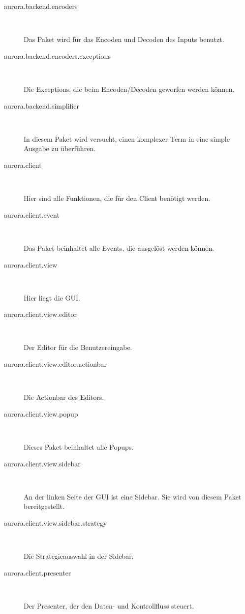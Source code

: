 \documentclass[parskip=full,11pt,twoside]{scrbook}
\begin{document}
\begin{description}
	\item[aurora.backend.encoders] ~\par
	Das Paket wird für das Encoden und Decoden des Inputs benutzt.
	
	\item[aurora.backend.encoders.exceptions] ~\par
	Die Exceptions, die beim Encoden/Decoden geworfen werden können.
	
	\item[aurora.backend.simplifier] ~\par
	In diesem Paket wird versucht, einen komplexer Term in eine simple Ausgabe zu überführen.
	
	\item[aurora.client] ~\par
	Hier sind alle Funktionen, die für den Client benötigt werden.
	
	\item[aurora.client.event] ~\par
	Das Paket beinhaltet alle Events, die ausgelöst werden können.
	
	\item[aurora.client.view] ~\par
	Hier liegt die GUI.
	
	\item[aurora.client.view.editor] ~\par
	Der Editor für die Benutzereingabe.
	
	\item[aurora.client.view.editor.actionbar] ~\par
	Die Actionbar des Editors.
	
	\item[aurora.client.view.popup] ~\par
	Dieses Paket beinhaltet alle Popups.
	
	\item[aurora.client.view.sidebar] ~\par
	An der linken Seite der GUI ist eine Sidebar.
    Sie wird von diesem Paket bereitgestellt.
	
	\item[aurora.client.view.sidebar.strategy] ~\par 
	Die Strategieauswahl in der Sidebar.
	
	\item[aurora.client.presenter] ~\par
	Der Presenter, der den Daten- und Kontrollfluss steuert.

\end{description}
\end{document}
